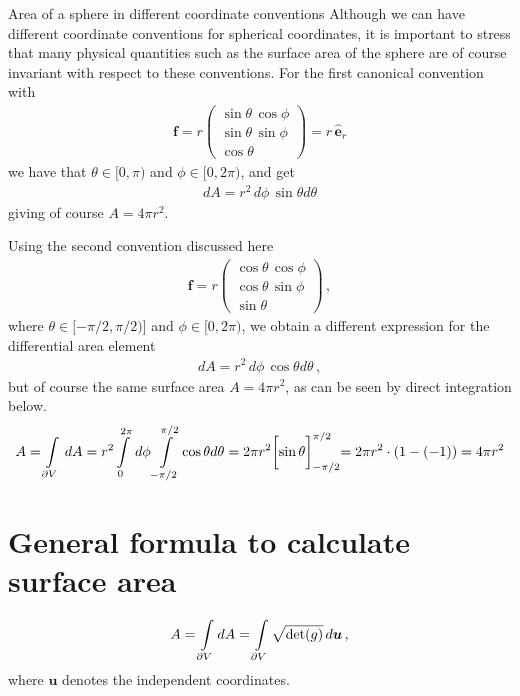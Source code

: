 \documentclass[11pt, DINA4, fleqn]{amsart}
\begin{document}
\begin{mybox_tc3}{Area of a sphere in different coordinate conventions}
Although we can have different coordinate conventions for spherical coordinates, it is important to stress that
many physical quantities such as the surface area of the sphere are of course invariant with respect to these conventions.
For the first canonical convention with
\begin{align}
\boldsymbol{f} = r\begin{pmatrix}
\sin\theta \, \cos\phi \\
\sin\theta \, \sin\phi \\
\cos\theta
\end{pmatrix} = r \, \hat{\boldsymbol{e}}_r
\end{align} we have that $\theta \in [0, \pi)$ and $\phi \in [0, 2\pi)$, and get
\begin{align}
dA = r^2 \, d\phi\, \sin\theta d\theta 
\end{align}
giving of course $A = 4\pi r^2$.

Using the second convention discussed here
\begin{align}
\boldsymbol{f} = r\begin{pmatrix}
\cos\theta \, \cos\phi \\
\cos\theta \, \sin\phi \\
\sin\theta
\end{pmatrix} \, ,
\end{align}
where $\theta \in [-\pi/2, \pi/2)$] and $\phi\in[0,2\pi)$, we obtain a different expression for the differential area element
\begin{align}
dA = r^2 \, d\phi\, \cos\theta d\theta \, ,
\end{align}
but of course the same surface area $A = 4\pi r^2$, as can be seen by direct integration below.
\begin{align}
A = \int\displaylimits_{\partial V} \, dA =  r^2 \int\displaylimits_{0}^{2\pi}\, d\phi \int \displaylimits_{-\pi/2}^{\pi/2} \cos\theta d\theta
= 2\pi r^2 \biggl[\sin\theta\biggl]_{-\pi/2}^{\pi/2} = 2\pi r^2 \cdot(1-(-1)) = 4\pi r^2
\end{align}
\end{mybox_tc3}


\section{General formula to calculate surface area}
\begin{align}
A = \int\displaylimits_{\partial V} dA = \int\displaylimits_{\partial V}\sqrt{\text{det}(g)} \, d\boldsymbol{u} \, ,
\end{align}
where $\boldsymbol{u}$ denotes the independent coordinates.
\end{document}
